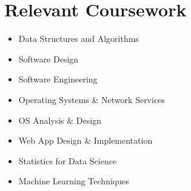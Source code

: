 \documentclass[letterpaper,11pt]{article}
\begin{document}
\section{Relevant Coursework}
    \begin{multicols}{3}
        \begin{itemize}[itemsep=-2pt, parsep=3pt]
            \item\small Data Structures and Algorithms
            \item Software Design
            \item Software Engineering
            \item Operating Systems \& Network Services
            \item OS Analysis \& Design
            \item Web App Design \& Implementation
            \item Statistics for Data Science
            \item Machine Learning Techniques
        \end{itemize}
    \end{multicols}
    \vspace*{2.0\multicolsep}

\end{document}
